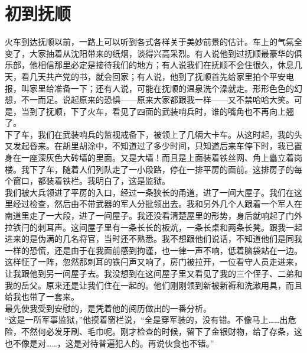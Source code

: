 \fancyhead[RO]{} %
\fancyhead[LE]{} %
\chapter*{初到抚顺}
\thispagestyle{empty}
火车到达抚顺以前，一路上可以听到各式各样关于美妙前景的估计。车上的气氛全变了，大家抽着从沈阳带来的纸烟，谈得兴高采烈。有人说他到过抚顺最豪华的俱乐部，他相信那里必定是接待我们的地方；有人说我们在抚顺不会住很久，休息几天，看几天共产党的书，就会回家；有人说，他到了抚顺首先给家里拍个平安电报，叫家里给准备一下；还有人说，可能在抚顺的温泉洗个澡就走。形形色色的幻想，不一而足。说起原来的恐惧——原来大家都跟我一样——又不禁哈哈大笑。可是，当到了抚顺，下了火车，看见了四面的武装哨兵时，谁的嘴角也不再向上翘了。\\

下了车，我们在武装哨兵的监视戒备下，被领上了几辆大卡车。从这时起，我的头又发起昏来。在胡里胡涂中，不知道过了多少时间，只知道后来车停下时，我已置身在一座深灰色大砖墙的里面。又是大墙！而且是上面装着铁丝网、角上矗立着岗楼。我下了车，随着人们列队走了一小段路，停在一排平房的面前。这排房子的每个窗口，都装着铁栏。我明白了，这是监狱。\\

我们被大兵领进了平房的入口，经过一条狭长的甬道，进了一间大屋子。我们在这里经过检查，然后由不带武器的军人分批领出去。我和另外几个人跟着一个军人在南道里走了一大段，进了一间屋子。我还没看清楚屋里的形势，身后就响起了门外拉铁闩的刺耳声。这间屋子里有一条长长的板炕，一条长桌和两条长凳。跟我一起进来的是伪满的几名将官，当时还不熟悉。我不想跟他们说话，不知道他们是同我一样的恐慌，还是由于在我面前感到拘谨，也一律一声不响，低着脑袋站在一边。这样怔了一阵，忽然那刺耳的铁闩声又响了，房门被拉开，一位看守人员走进来，让我跟他到另一间屋子去。我没想到在这间屋子里又看见了我的三个侄子、二弟和我的岳父。原来还是让我们住在一起的。他们刚刚领到新被新褥和洗漱用具，而且给我也带了一套来。\\

最先使我受到安慰的，是凭着他的阅历做出的一番分析。\\

“这是一所军事监狱，”他摸着窗栏说，“全是穿军装的，没有错。不像马上……出危险，不然何必发牙刷、毛巾呢。刚才检查的时候，留下了金银财物，给了存条，这也不像是对……，这是对待普遍犯人的。再说伙食也不错。”\\

